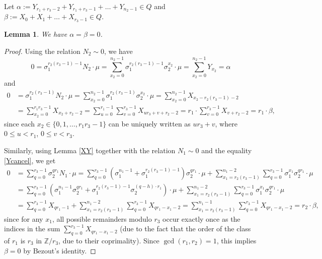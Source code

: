 \documentclass[12pt,a4paper]{article}
\newtheorem{lemma}[theorem]{Lemma}
\theoremstyle{definition}
\newcommand{\Z}{\mathbb{Z}}
\begin{document}
\paragraph*{}
Let $\alpha:= Y_{r_1+r_3-2}+Y_{r_1+r_3-1}+\dots+Y_{n_2-1}\in Q$ and $\beta:=X_0+X_1+\dots+X_{r_3-1}\in Q$.
\begin{lemma}\label{AB}
We have $\alpha=\beta=0$.
\end{lemma}
\begin{proof}
Using the relation $N_2\sim 0$, we have $$0=\sigma_1^{r_2(r_3-1)-1}N_2\cdot \mu =\sum_{x_2=0}^{n_2-1}  \sigma_1^{r_2(r_3-1)-1}\sigma_2^{x_2}\cdot \mu= \sum_{x_2=0}^{n_2-1}Y_{x_2}=\alpha$$ and
\begin{align*}
0&= \sigma_1^{r_2(r_3-1)}N_2\cdot \mu=\sum_{x_2=0}^{n_2-1}  \sigma_1^{r_2(r_3-1)}\sigma_2^{x_2}\cdot \mu=\sum_{x_2=0}^{n_2-1}  X_{x_2-r_2(r_3-1)-2}\\
&=\sum_{x_2=0}^{r_1r_3-1}  X_{x_2+r_2-2}=
\sum_{u=0}^{r_1-1}\sum_{v=0}^{r_3-1} X_{ur_3+v+r_2-2}=r_1\cdot \sum_{v=0}^{r_3-1} X_{v+r_2-2}=r_1\cdot \beta,
\end{align*}
since each $x_2\in\{0,1,\dots,r_1r_3-1\}$ can be uniquely written as $ur_3+v$, where $0\leq u<r_1$, $0\leq v<r_3$.%

Similarly, using Lemma \ref{XY} together with the relation $N_1\sim 0$ and the equality \eqref{Ycancel}, %
we get
\begin{align*}
0&= \sum_{q=0}^{r_3-1} \sigma_2^{qr_1}N_1\cdot \mu =\sum_{q=0}^{r_3-1}\left(\sigma_1^{n_1-1}+\sigma_1^{r_2(r_3-1)-1}\right) \sigma_2^{qr_1}\cdot \mu   
+\sum_{x_1=r_2(r_3-1)}^{n_1-2}\sum_{q=0}^{r_3-1} \sigma_1^{x_1}\sigma_2^{qr_1}\cdot \mu\\
&=\sum_{q=0}^{r_3-1}(\sigma_1^{n_1-1}\sigma_2^{qr_1}+\sigma_1^{r_2(r_3-1)-1}\sigma_2^{(q-h)\cdot r_1})\cdot \mu
+\sum_{x_1=r_2(r_3-1)}^{n_1-2}\sum_{q=0}^{r_3-1} \sigma_1^{x_1}\sigma_2^{qr_1}\cdot \mu\\
&=\sum_{q=0}^{r_3-1}X_{qr_1-1}+\sum_{x_1=r_2(r_3-1)}^{n_1-2}\sum_{q=0}^{r_3-1}X_{qr_1-x_1-2}
= \sum_{x_1=r_2(r_3-1)}^{n_1-1}\sum_{q=0}^{r_3-1}X_{qr_1-x_1-2}
=r_2\cdot \beta,
\end{align*}
since for any $x_1$, all possible remainders modulo $r_3$ occur exactly once as the indices in the sum $\sum_{q=0}^{r_3-1}X_{qr_1-x_1-2}$ (due to the fact that the order of the class of $r_1$ is $r_3$ in $\Z/r_3$, due to their coprimality).
Since $\gcd(r_1,r_2)=1$, this implies $\beta=0$ by Bezout's identity.
\end{proof}
\end{document}
